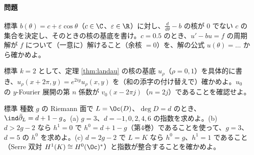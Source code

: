 \paragraph{問題}
\begin{prob}{標準}\label{p:S1b}
$b(\theta)=c+\varepsilon\cos\theta$（$c\in\C$、$\varepsilon\in\R$）に対し、$\frac d{d\theta}-b$ の核が $0$ でない $c$ の集合を決定し、そのときの核の基底を書け。$c=0.5$ のとき、$u'-bu=f$ の周期解が $f$ について（一意に）解けること（余核 $=0$）を、解の公式 $u(\theta)=\dots$ から確かめよ。
\end{prob}
\begin{prob}{標準}\label{p:landau2}
$k=2$ として、定理 \ref{thm:landau} の核の基底 $u_\rho$（$\rho=0,1$）を具体的に書き、$u_\rho(x+2\pi,y)=e^{2iy}u_\rho(x,y)$ を（和の添字の付け替えで）確かめよ。$u_0$ の $y$-Fourier 展開の第 $n$ 係数が $v_0(x-2\pi j)$（$n=2j$）であることを確認せよ。
\end{prob}
\begin{prob}{標準}\label{p:RRtable}
種数 $g$ の Riemann 面で $L=\Oc(D)$、$\deg D=d$ のとき、$\ind\bar\partial_L=d+1-g$。(a) $g=3$、$d=-1,0,2,4,6$ の指数を求めよ。(b) $d>2g-2$ なら $h^1=0$ で $h^0=d+1-g$（第4巻）であることを使って、$g=3$、$d=5$ の $h^0$ を求めよ。(c) $d=2g-2$ で $L=K$ なら $h^0=g$、$h^1=1$ であること（Serre 双対 $H^1(K)\cong H^0(\Oc)^*$）と指数が整合することを確かめよ。
\end{prob}
